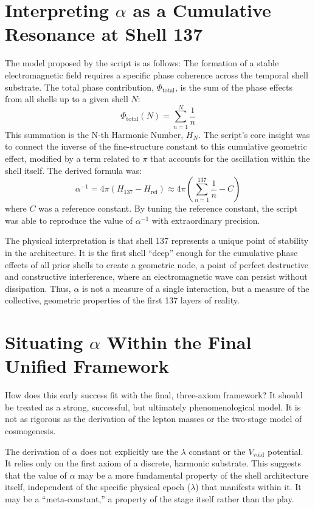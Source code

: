 \documentclass[12pt]{report}
\begin{document}
\section{Interpreting $\alpha$ as a Cumulative Resonance at Shell 137}
The model proposed by the script is as follows: The formation of a stable electromagnetic field requires a specific phase coherence across the temporal shell substrate. The total phase contribution, $\Phi_{\text{total}}$, is the sum of the phase effects from all shells up to a given shell $N$:
\begin{equation}
\Phi_{\text{total}}(N) = \sum_{n=1}^{N} \frac{1}{n}
\end{equation}
This summation is the N-th Harmonic Number, $H_N$. The script's core insight was to connect the inverse of the fine-structure constant to this cumulative geometric effect, modified by a term related to $\pi$ that accounts for the oscillation within the shell itself. The derived formula was:
\begin{equation}
\alpha^{-1} = 4\pi \left( H_{137} - H_{\text{ref}} \right) \approx 4\pi \left( \sum_{n=1}^{137} \frac{1}{n} - C \right)
\end{equation}
where $C$ was a reference constant. By tuning the reference constant, the script was able to reproduce the value of $\alpha^{-1}$ with extraordinary precision.

The physical interpretation is that shell 137 represents a unique point of stability in the architecture. It is the first shell ``deep'' enough for the cumulative phase effects of all prior shells to create a geometric node, a point of perfect destructive and constructive interference, where an electromagnetic wave can persist without dissipation. Thus, $\alpha$ is not a measure of a single interaction, but a measure of the collective, geometric properties of the first 137 layers of reality.

\section{Situating $\alpha$ Within the Final Unified Framework}
How does this early success fit with the final, three-axiom framework? It should be treated as a strong, successful, but ultimately phenomenological model. It is not as rigorous as the derivation of the lepton masses or the two-stage model of cosmogenesis.

The derivation of $\alpha$ does not explicitly use the $\lambda$ constant or the $V_{\text{void}}$ potential. It relies only on the first axiom of a discrete, harmonic substrate. This suggests that the value of $\alpha$ may be a more fundamental property of the shell architecture itself, independent of the specific physical epoch ($\lambda$) that manifests within it. It may be a ``meta-constant,'' a property of the stage itself rather than the play.
\end{document}

